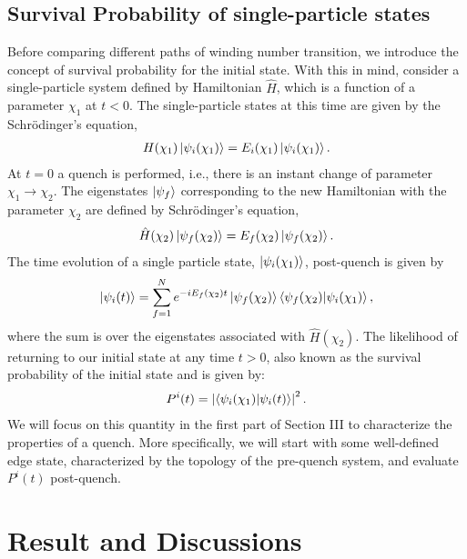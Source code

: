 \documentclass[aps,pra,reprint,superscriptaddress,longbibliography]{revtex4-2}
\begin{document}
    \subsection{Survival Probability of single-particle states}
   Before comparing different paths of winding number transition, we introduce the concept of survival probability for the initial state. With this in mind, consider a single-particle system defined by Hamiltonian $\hat{H}$, which is a function of a parameter $\chi_{1} $ at $t < 0$. The single-particle states at this time are given by the Schr\"{o}dinger's equation, 
 \begin{eqnarray}
 H(\chi_{1})\ket{\psi_{i}(\chi_{1})}=E_{i}(\chi_{1})\ket{\psi_{i}(\chi_{1})}.
 \end{eqnarray}   
At $t=0$  a quench is performed, i.e., there is an instant change of parameter $\chi_{1} \rightarrow \chi_{2} $. The eigenstates $\ket{\psi_{f} }$ corresponding to the new Hamiltonian with the parameter $\chi_{2} $ are defined by  Schr\"{o}dinger's equation, 
\begin{eqnarray}
\hat{H}(\chi_{2})\ket{\psi_{f}(\chi_{2})}=E_{f}(\chi_{2})\ket{\psi_{f}(\chi_{2})}.
\end{eqnarray} 
The time evolution of a single particle state, $\ket{\psi_{i}(\chi_{1})}$, post-quench is given by
\begin{equation}\label{eq:11}	
	\ket{\psi_{i}(t)}=\sum_{f=1}^{N}e^{-iE_{f}(\chi_{2})t}\ket{\psi_{f}(\chi_{2})}\bra{{\psi_{f}(\chi_{2})}}\ket{\psi_{i}(\chi_{1})},
\end{equation}
where the sum is over the eigenstates associated with  $\hat{H}(\chi_{2})$. The likelihood of returning to our initial state at any time $t > 0$, also known as the survival probability  of the initial state and is given by: 	
\begin{eqnarray}
P^{i} (t)=\left|\bra{\psi_{i}(\chi_{1})}\ket{\psi_{i}(t)} \right|^{2}.
\end{eqnarray}
We will focus on this quantity in the first part of Section III to characterize the properties of a quench. More specifically, we will start with some well-defined edge state, characterized by the topology of the pre-quench system, and evaluate $P^i(t)$ post-quench.

    \section{Result and Discussions}
    
\end{document}
